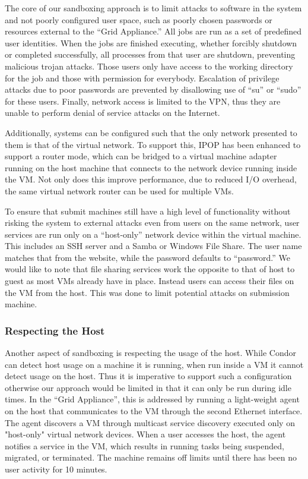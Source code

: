 \documentclass[twocolumn]{svjour3}
\begin{document}
The core of our sandboxing approach is to limit attacks to software in the
system and not poorly configured user space, such as poorly chosen passwords or
resources external to the ``Grid Appliance.''  All jobs are run as a set of
predefined user identities.  When the jobs are finished executing, whether
forcibly shutdown or completed successfully, all processes from that user are
shutdown, preventing malicious trojan attacks.  Those users only have access to
the working directory for the job and those with permission for everybody.
Escalation of privilege attacks due to poor passwords are prevented by
disallowing use of ``su'' or ``sudo'' for these users.  Finally, network access
is limited to the VPN, thus they are unable to perform denial of service
attacks on the Internet.

Additionally, systems can be configured such that the only network presented to
them is that of the virtual network.  To support this, IPOP has been enhanced to
support a router mode, which can be bridged to a virtual machine adapter
running on the host machine that connects to the network device running inside
the VM.  Not only does this improve performance, due to reduced I/O overhead,
the same virtual network router can be used for multiple VMs.

To ensure that submit machines still have a high level of functionality without
risking the system to external attacks even from users on the same network,
user services are run only on a ``host-only'' network device within the virtual
machine.  This includes an SSH server and a Samba or Windows File Share.  The
user name matches that from the website, while the password defaults to
``password.''  We would like to note that file sharing services work the
opposite to that of host to guest as most VMs already have in place.  Instead
users can access their files on the VM from the host.  This was done to limit
potential attacks on submission machine.

\subsubsection{Respecting the Host}

Another aspect of sandboxing is respecting the usage of the host.  While Condor
can detect host usage on a machine it is running, when run inside a VM it
cannot detect usage on the host.  Thus it is imperative to support such a
configuration otherwise our approach would be limited in that it can only be
run during idle times.  In the ``Grid Appliance'', this is addressed by running
a light-weight agent on the host that communicates to the VM through the second
Ethernet interface.  The agent discovers a VM through multicast service
discovery executed only on "host-only" virtual network devices.  When a user
accesses the host, the agent notifies a service in the VM, which results in
running tasks being suspended, migrated, or terminated.  The machine remains
off limits until there has been no user activity for 10 minutes.
\end{document}
